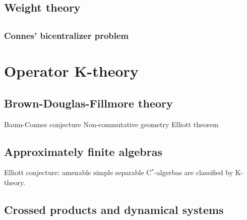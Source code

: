 \documentclass{../../large}
\begin{document}
\begin{prb}

\end{prb}




\chapter{Weight theory}





\chapter{}
\section{Connes' bicentralizer problem}












\part{Operator K-theory}
\chapter{Brown-Douglas-Fillmore theory}
\begin{prb}
\end{prb}

Baum-Connes conjecture
Non-commutative geometry
Elliott theorem




\chapter{Approximately finite algebras}
Elliott conjecture: amenable simple separable C$^*$-algerbas are classified by K-theory.

\chapter{Crossed products and dynamical systems}
\end{document}
